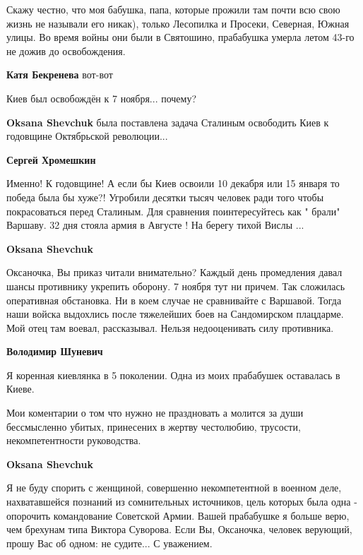 \begin{itemize}
\begin{itemize}
\begin{itemize}
Скажу честно, что моя бабушка, папа, которые прожили там почти всю свою жизнь
не называли его никак), только Лесопилка и Просеки, Северная, Южная улицы. Во
время войны они были в Святошино, прабабушка умерла летом 43-го не дожив до
освобождения.

\textbf{Катя Бекренева} вот-вот
\end{itemize} %

\end{itemize} %

Киев был освобождён к 7 ноября... почему?

\begin{itemize} %
\textbf{Oksana Shevchuk} была поставлена задача Сталиным освободить Киев к годовщине Октябрьской революции...

\begin{itemize} %
\textbf{Сергей Хромешкин}

Именно! К годовщине! А если бы Киев освоили 10 декабря или 15 января то победа была бы хуже?!
Угробили десятки тысяч человек ради того чтобы покрасоваться перед Сталиным.
Для сравнения поинтересуйтесь как " брали" Варшаву.
32 дня стояла армия в Августе ! На берегу тихой Вислы ...

\textbf{Oksana Shevchuk} 

Оксаночка, Вы приказ читали внимательно? Каждый день промедления давал шансы
противнику укрепить оборону. 7 ноября тут ни причем. Так сложилась оперативная
обстановка. Ни в коем случае не сравнивайте с Варшавой. Тогда наши войска
выдохлись после тяжелейших боев на Сандомирском плацдарме. Мой отец там воевал,
рассказывал. Нельзя недооценивать силу противника.

\textbf{Володимир Шуневич}

Я коренная киевлянка в 5 поколении. Одна из моих прабабушек оставалась в Киеве.

Мои коментарии о том что нужно не праздновать а молится за души бессмысленно
убитых, принесених в жертву честолюбию, трусости, некомпетентности руководства.

\textbf{Oksana Shevchuk} 

Я не буду спорить с женщиной, совершенно некомпетентной в военном деле,
нахватавшейся познаний из сомнительных источников, цель которых была одна -
опорочить командование Советской Армии. Вашей прабабушке я больше верю, чем
брехунам типа Виктора Суворова. Если Вы, Оксаночка, человек верующий, прошу Вас
об одном: не судите... С уважением.


\end{itemize}
\end{itemize}
\end{itemize}
